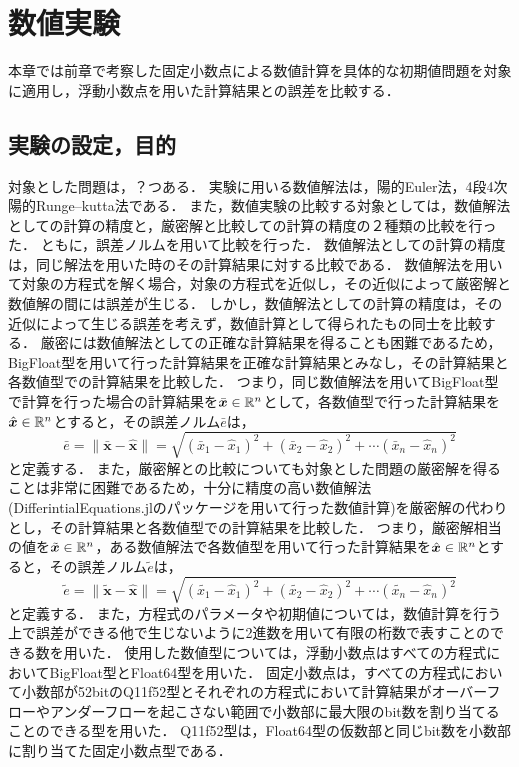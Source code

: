 \chapter{数値実験}
\label{chap:数値実験}
本章では前章で考察した固定小数点による数値計算を具体的な初期値問題を対象に適用し，浮動小数点を用いた計算結果との誤差を比較する．
\section{実験の設定，目的}
対象とした問題は，？つある．
実験に用いる数値解法は，陽的Euler法，4段4次陽的Runge--kutta法である．
また，数値実験の比較する対象としては，数値解法としての計算の精度と，厳密解と比較しての計算の精度の２種類の比較を行った．
ともに，誤差ノルムを用いて比較を行った．
数値解法としての計算の精度は，同じ解法を用いた時のその計算結果に対する比較である．
数値解法を用いて対象の方程式を解く場合，対象の方程式を近似し，その近似によって厳密解と数値解の間には誤差が生じる．
しかし，数値解法としての計算の精度は，その近似によって生じる誤差を考えず，数値計算として得られたもの同士を比較する．
厳密には数値解法としての正確な計算結果を得ることも困難であるため，BigFloat型を用いて行った計算結果を正確な計算結果とみなし，その計算結果と各数値型での計算結果を比較した．
つまり，同じ数値解法を用いてBigFloat型で計算を行った場合の計算結果を$\bar{\bm{x}} \in \mathbb{R}^n$として，各数値型で行った計算結果を$\hat{\bm{x}} \in \mathbb{R}^n$とすると，その誤差ノルム$\bar{e}$は，
\begin{equation}
    \bar{e} = \|\bar{\bm{x}} - \hat{\bm{x}}\| = \sqrt{(\bar{x}_1 - \hat{x}_1)^2 + (\bar{x}_2 - \hat{x}_2)^2 + \cdots (\bar{x}_n - \hat{x}_n)^2}
\end{equation}
と定義する．
また，厳密解との比較についても対象とした問題の厳密解を得ることは非常に困難であるため，十分に精度の高い数値解法(DifferintialEquations.jlのパッケージを用いて行った数値計算)を厳密解の代わりとし，その計算結果と各数値型での計算結果を比較した．
つまり，厳密解相当の値を$\tilde{\bm{x}} \in \mathbb{R}^n$，ある数値解法で各数値型を用いて行った計算結果を$\hat{\bm{x}} \in \mathbb{R}^n$とすると，その誤差ノルム$\tilde{e}$は，
\begin{equation}
   \tilde{e}  = \|\tilde{\bm{x}} - \hat{\bm{x}}\| = \sqrt{(\tilde{x_1} - \hat{x}_1)^2 + (\tilde{x_2} - \hat{x}_2)^2 + \cdots (\tilde{x_n} - \hat{x}_n)^2}
\end{equation}
と定義する．
また，方程式のパラメータや初期値については，数値計算を行う上で誤差ができる他で生じないように2進数を用いて有限の桁数で表すことのできる数を用いた．
使用した数値型については，浮動小数点はすべての方程式においてBigFloat型とFloat64型を用いた．
固定小数点は，すべての方程式において小数部が52bitのQ11f52型とそれぞれの方程式において計算結果がオーバーフローやアンダーフローを起こさない範囲で小数部に最大限のbit数を割り当てることのできる型を用いた．
Q11f52型は，Float64型の仮数部と同じbit数を小数部に割り当てた固定小数点型である．
